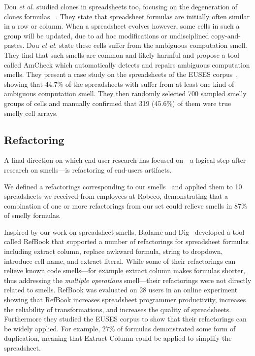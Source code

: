 \documentclass[conference]{IEEEtran}
\begin{document}
Dou \emph{et al.} studied clones in spreadsheets too, focusing on the degeneration of clones formulas ~\cite{dou_is_2014}. They state that spreadsheet formulas are initially often similar in a row or column. When a spreadsheet evolves however, some cells in such a group will be updated, due to ad hoc modifications or undisciplined copy-and-pastes. Dou \emph{et al.} state these cells suffer from the ambiguous computation smell. They find that such smells are common and likely harmful and propose a tool called AmCheck which automatically detects and repairs ambiguous computation smells. They present a case study on the spreadsheets of the EUSES corpus~\cite{fisher_euses_2005}, showing that 44.7\% of the spreadsheets with suffer from at  least  one  kind  of ambiguous computation smell. They then randomly selected 700 sampled smelly groups of cells and manually confirmed that 319 (45.6\%) of them were true smelly cell arrays. 

\subsection{Refactoring}
A final direction on which end-user research has focused on---a logical step after research on smells---is refactoring of end-users artifacts. 

We defined a refactorings corresponding to our smells~\cite{hermans_detecting_2014} and applied them to 10 spreadsheets we received from employees at Robeco, demonstrating that a combination of one or more refactorings from our set could relieve smells in 87\% of smelly formulas. 

Inspired by our work on spreadsheet smells, Badame and Dig~\cite{badame_refactoring_2012} developed a tool called RefBook that supported a number of refactorings for spreadsheet formulas including extract column, replace awkward formula, string to dropdown, introduce cell name, and extract literal. While some of their refactorings can relieve known code smells---for example extract column makes formulas shorter, thus addressing the \emph{multiple operations} smell---their refactorings were not directly related to smells. RefBook was evaluated on 28 users in an online experiment showing that RefBook increases spreadsheet programmer
productivity, increases the reliability of transformations, and increases the quality of spreadsheets. Furthermore they studied the EUSES corpus to show that their refactorings can be widely applied. For example, 27\% of formulas demonstrated some form of duplication, meaning that Extract Column could be applied to simplify the spreadsheet.
\end{document}
